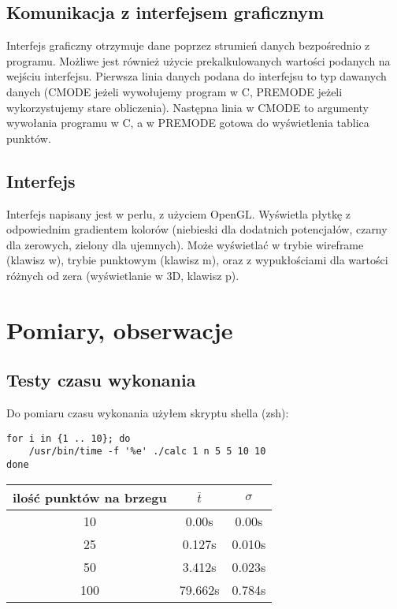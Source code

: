 \documentclass{article}
\begin{document}
\subsection{Komunikacja z interfejsem graficznym}
Interfejs graficzny otrzymuje dane poprzez strumień danych bezpośrednio z programu.
Możliwe jest również użycie prekalkulowanych wartości podanych na wejściu interfejsu.
Pierwsza linia danych podana do interfejsu to typ dawanych danych (CMODE jeżeli wywołujemy
program w C, PREMODE jeżeli wykorzystujemy stare obliczenia). Następna linia w CMODE to argumenty wywołania
programu w C, a w PREMODE gotowa do wyświetlenia tablica punktów.
\subsection{Interfejs}
Interfejs napisany jest w perlu, z użyciem OpenGL. Wyświetla płytkę z odpowiednim gradientem kolorów (niebieski
dla dodatnich potencjałów, czarny dla zerowych, zielony dla ujemnych). Może wyświetlać w trybie wireframe (klawisz w),
trybie punktowym (klawisz m), oraz z wypukłościami dla wartości różnych od zera (wyświetlanie w 3D, klawisz p).
\section{Pomiary, obserwacje}
\subsection{Testy czasu wykonania}
Do pomiaru czasu wykonania użyłem skryptu shella (zsh):
\begin{lstlisting}
for i in {1 .. 10}; do
	/usr/bin/time -f '%e' ./calc 1 n 5 5 10 10 
done
\end{lstlisting}
\begin{tabular}{|c|c|c|}
\hline
ilość punktów na brzegu & $\overline{t}$ & $\sigma$ \\
\hline
10 & 0.00s & 0.00s  \\
\hline
25 & 0.127s & 0.010s  \\
\hline
50 & 3.412s & 0.023s \\
\hline
100 & 79.662s & 0.784s \\
\hline
\end{tabular}
\end{document}
